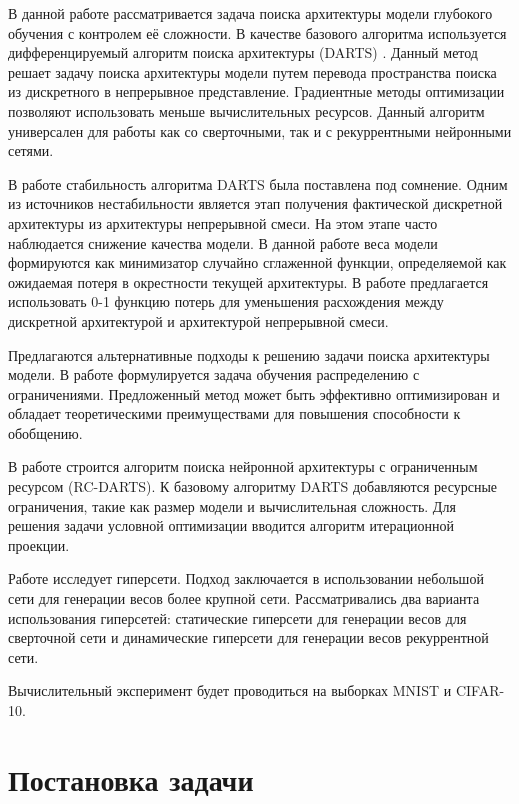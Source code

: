 \documentclass[12pt, twoside]{article}
\begin{document}
В данной работе рассматривается задача поиска архитектуры модели глубокого обучения с контролем её сложности. В качестве базового алгоритма используется дифференцируемый алгоритм поиска архитектуры (DARTS) \cite{journals/corr/abs-1806-09055}. Данный метод решает задачу поиска архитектуры модели путем перевода пространства поиска из дискретного в непрерывное представление. Градиентные методы оптимизации позволяют использовать меньше вычислительных ресурсов. Данный алгоритм универсален для работы как со сверточными, так и с рекуррентными нейронными сетями.

В работе \cite{journals/corr/abs-2002-05283} стабильность алгоритма DARTS была поставлена под сомнение. Одним из источников нестабильности является этап получения фактической дискретной архитектуры из архитектуры непрерывной смеси. На этом этапе часто наблюдается снижение качества модели. В данной работе веса модели формируются как минимизатор случайно сглаженной функции, определяемой как ожидаемая потеря в окрестности текущей архитектуры. В работе \cite{journals/corr/abs-1911-12126} предлагается использовать 0-1 функцию потерь для уменьшения расхождения между дискретной архитектурой и архитектурой непрерывной смеси.

Предлагаются альтернативные подходы к решению задачи поиска архитектуры модели. В работе \cite{journals/corr/abs-2006-10355} формулируется задача обучения распределению с ограничениями. Предложенный метод может быть эффективно оптимизирован и обладает теоретическими преимуществами для повышения способности к обобщению.

В работе \cite{journals/corr/abs-1912-12814} строится алгоритм поиска нейронной архитектуры с ограниченным ресурсом (RC-DARTS). К базовому алгоритму DARTS добавляются ресурсные ограничения, такие как размер модели и вычислительная сложность. Для решения задачи условной оптимизации вводится алгоритм итерационной проекции.

Работе \cite{journals/corr/HaDL16} исследует гиперсети. Подход заключается в использовании небольшой сети для генерации весов более крупной сети. Рассматривались два варианта использования гиперсетей: статические гиперсети для генерации весов для сверточной сети и динамические гиперсети для генерации весов рекуррентной сети.

Вычислительный эксперимент будет проводиться на выборках MNIST\cite{lecun-mnisthandwrittendigit-2010} и CIFAR-10\cite{cif}.

\section{Постановка задачи}


\end{document}
